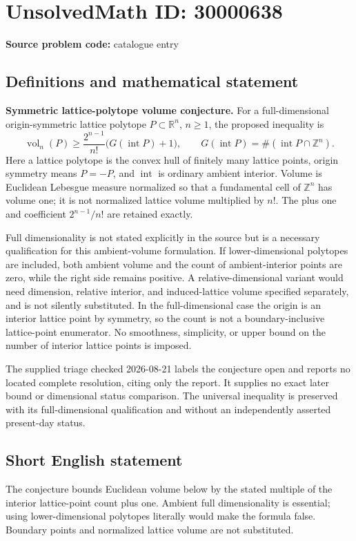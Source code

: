 \documentclass[11pt]{article}
\newcommand{\Z}{\mathbb{Z}}
\newcommand{\R}{\mathbb{R}}
\begin{document}
\section*{UnsolvedMath ID: 30000638}
\textbf{Source problem code:} catalogue entry
\subsection{Definitions and mathematical statement}
\textbf{Symmetric lattice-polytope volume conjecture.} For a full-dimensional origin-symmetric lattice polytope \(P\subset\R^n\), \(n\ge1\), the proposed inequality is\[\operatorname{vol}_n(P)\ge\frac{2^{n-1}}{n!}\bigl(G(\operatorname{int}P)+1\bigr),\qquad G(\operatorname{int}P)=\#(\operatorname{int}P\cap\Z^n).\] Here a lattice polytope is the convex hull of finitely many lattice points, origin symmetry means \(P=-P\), and \(\operatorname{int}\) is ordinary ambient interior. Volume is Euclidean Lebesgue measure normalized so that a fundamental cell of \(\Z^n\) has volume one; it is not normalized lattice volume multiplied by \(n!\). The plus one and coefficient \(2^{n-1}/n!\) are retained exactly.\par Full dimensionality is not stated explicitly in the source but is a necessary qualification for this ambient-volume formulation. If lower-dimensional polytopes are included, both ambient volume and the count of ambient-interior points are zero, while the right side remains positive. A relative-dimensional variant would need dimension, relative interior, and induced-lattice volume specified separately, and is not silently substituted. In the full-dimensional case the origin is an interior lattice point by symmetry, so the count is not a boundary-inclusive lattice-point enumerator. No smoothness, simplicity, or upper bound on the number of interior lattice points is imposed.\par The supplied triage checked 2026-08-21 labels the conjecture open and reports no located complete resolution, citing only the report. It supplies no exact later bound or dimensional status comparison. The universal inequality is preserved with its full-dimensional qualification and without an independently asserted present-day status.
\subsection{Short English statement}
The conjecture bounds Euclidean volume below by the stated multiple of the interior lattice-point count plus one. Ambient full dimensionality is essential; using lower-dimensional polytopes literally would make the formula false. Boundary points and normalized lattice volume are not substituted.
\end{document}
